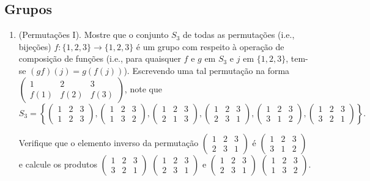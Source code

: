 \subsection{Grupos}

\begin{enumerate}[label=8.\arabic*.]

    \item (Permutações I). Mostre que o conjunto $S_3$ de todas as permutações (i.e., bijeções) 
    $f: \{1,2,3\} \to \{1,2,3\}$ é um grupo com respeito à operação de composição de funções (i.e., 
    para quaisquer $f$ e $g$ em $S_3$ e $j$ em $\{1,2,3\}$, tem-se $(gf)(j) = g(f(j))$). 
    Escrevendo uma tal permutação na forma 
    $\begin{pmatrix} 
        1 & 2 & 3 \\ 
        f(1) & f(2) & f(3) 
    \end{pmatrix}$,
    note que 
    \[
    S_3 = \left\{ 
    \begin{pmatrix}1&2&3\\1&2&3\end{pmatrix}, 
    \begin{pmatrix}1&2&3\\1&3&2\end{pmatrix}, 
    \begin{pmatrix}1&2&3\\2&1&3\end{pmatrix}, 
    \begin{pmatrix}1&2&3\\2&3&1\end{pmatrix}, 
    \begin{pmatrix}1&2&3\\3&1&2\end{pmatrix}, 
    \begin{pmatrix}1&2&3\\3&2&1\end{pmatrix} 
    \right\}.
    \] 

    Verifique que o elemento inverso da permutação 
    \(
    \begin{pmatrix}1&2&3\\2&3&1\end{pmatrix}
    \) 
    é 
    \(
    \begin{pmatrix}1&2&3\\3&1&2\end{pmatrix}
    \) 
    e calcule os produtos $\begin{pmatrix}1&2&3\\3&2&1\end{pmatrix}$ $\begin{pmatrix}1&2&3\\2&3&1\end{pmatrix}$ 
    e $\begin{pmatrix}1&2&3\\2&3&1\end{pmatrix}$ $\begin{pmatrix}1&2&3\\1&3&2\end{pmatrix}$.
    


\end{enumerate}
